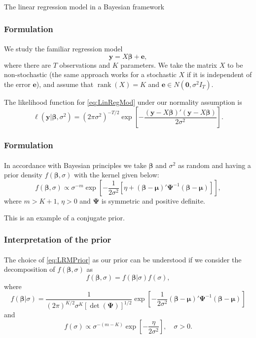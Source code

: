 \documentclass[10pt]{beamer}
\DeclareMathOperator*{\rank}{rank}
\theoremstyle{definition}
\begin{document}
\begin{section}{The linear regression model in a Bayesian framework}\label{sec:BayesLM}

\begin{frame}[fragile]
\frametitle{Formulation}
\framesubtitle{}
We study the familiar regression model \begin{equation}
\label{eq:LinRegMod}
\mathbf{y}=X\boldsymbol{\beta}+\mathbf{e},
\end{equation}
where there are $T$ observations and $K$ parameters. We take the matrix $X$ to be non-stochastic (the same approach works for a stochastic $ X $ if it is independent of the error $\mathbf{e}$), and assume that $\rank(X)=K$ and
$\mathbf{e}\in N(\mathbf{0},\sigma^2 I_T)$.\bigskip \bigskip

The likelihood function for \eqref{eq:LinRegMod} under our normality assumption is \begin{equation}
\label{eq:LRMLik} \ell
(\mathbf{y}|\boldsymbol{\beta}, \sigma^2)=(2\pi \sigma^2)^{-T/2}\exp
\left[
-\frac{(\mathbf{y}-X\boldsymbol{\beta})'(\mathbf{y}-X\boldsymbol{\beta})}{2\sigma^2}
\right].
\end{equation} 
\end{frame}

\begin{frame}[fragile]
\frametitle{Formulation}
\framesubtitle{}
In accordance with Bayesian principles we take $\boldsymbol{\beta}$ and $\sigma^2$ as random and having a prior density $ f(\boldsymbol{\beta},\sigma) $ with the kernel given below: \begin{equation}
\label{eq:LRMPrior}f(\boldsymbol{\beta},\sigma)\propto\sigma^{-m}\exp\left[
-\frac{1}{2\sigma^2}[\eta+(\boldsymbol{\beta}-\boldsymbol{\mu})'\boldsymbol{\Psi}^{-1}(\boldsymbol{\beta}-\boldsymbol{\mu})]
\right],
\end{equation}
where $m>K+1$, $\eta>0$ and $\boldsymbol{\Psi}$ is symmetric and positive definite.\bigskip \bigskip

This is an example of a conjugate prior.
\end{frame}

\begin{frame}[fragile]
\frametitle{Interpretation of the prior}
\framesubtitle{}
The choice of \eqref{eq:LRMPrior} as our prior can be understood if we consider the decomposition of $f(\boldsymbol{\beta},\sigma)$ as \begin{equation}
\label{eq:DecompLMRPrior}
f(\boldsymbol{\beta},\sigma)=f(\boldsymbol{\beta}|\sigma)f(\sigma),
\end{equation} 
where
\begin{equation}
\label{eq:CondBeta}f(\boldsymbol{\beta}|\sigma)=\frac{1}{(2\pi)^{K/2}\sigma^K
[\det (\boldsymbol{\Psi})]^{1/2}}\exp \left[
-\frac{1}{2\sigma^2}(\boldsymbol{\beta}-\boldsymbol{\mu})'\boldsymbol{\Psi}^{-1}(\boldsymbol{\beta}-\boldsymbol{\mu})\right]
\end{equation} and 
\begin{equation}
\label{eq:SigmaPrior}f(\sigma)\propto \sigma^{-(m-K)}\exp
\left[ -\frac{\eta}{2\sigma^2} \right],\quad \sigma>0.
\end{equation}\bigskip


\end{frame}
\end{section}
\end{document}
